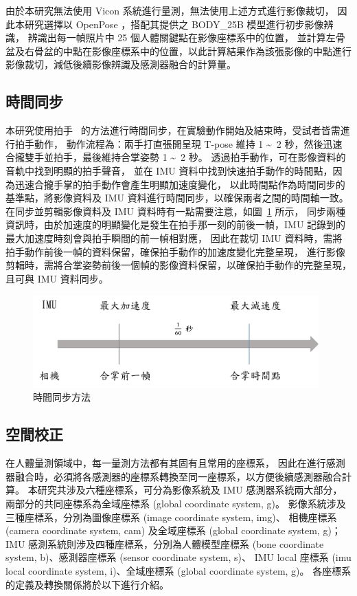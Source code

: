 由於本研究無法使用 Vicon 系統進行量測，無法使用上述方式進行影像裁切，
因此本研究選擇以 OpenPose ，搭配其提供之 BODY\_25B 模型進行初步影像辨識，
辨識出每一幀照片中 25 個人體關鍵點在影像座標系中的位置，
並計算左骨盆及右骨盆的中點在影像座標系中的位置，以此計算結果作為該張影像的中點進行影像裁切，減低後續影像辨識及感測器融合的計算量。

\subsection{時間同步}
本研究使用拍手~\cite{pons2012data} 的方法進行時間同步，在實驗動作開始及結束時，受試者皆需進行拍手動作，
動作流程為：兩手打直張開呈現 T-pose 維持 1 \textasciitilde\ 2 秒，然後迅速合攏雙手並拍手，最後維持合掌姿勢 1 \textasciitilde\ 2 秒。
透過拍手動作，可在影像資料的音軌中找到明顯的拍手聲音，
並在 IMU 資料中找到快速拍手動作的時間點，因為迅速合攏手掌的拍手動作會產生明顯加速度變化，
以此時間點作為時間同步的基準點，將影像資料及 IMU 資料進行時間同步，以確保兩者之間的時間軸一致。
在同步並剪輯影像資料及 IMU 資料時有一點需要注意，如圖~\ref{ch3_fig_timesyn} 所示，
同步兩種資訊時，由於加速度的明顯變化是發生在拍手那一刻的前後一幀，IMU 記錄到的最大加速度時刻會與拍手瞬間的前一幀相對應，
因此在裁切 IMU 資料時，需將拍手動作前後一幀的資料保留，確保拍手動作的加速度變化完整呈現，
進行影像剪輯時，需將合掌姿勢前後一個幀的影像資料保留，以確保拍手動作的完整呈現，且可與 IMU 資料同步。

\begin{figure}[!ht]
   \centering
   \includegraphics[width=11cm]{figure/ch3_fig_timesyn.png}
   \caption[時間同步方法]{時間同步方法}
   \label{ch3_fig_timesyn}
\end{figure}

\clearpage

\subsection{空間校正}
在人體量測領域中，每一量測方法都有其固有且常用的座標系，
因此在進行感測器融合時，必須將各感測器的座標系轉換至同一座標系，以方便後續感測器融合計算。
本研究共涉及六種座標系，可分為影像系統及 IMU 感測器系統兩大部分，兩部分的共同座標系為全域座標系 (global coordinate system, g)。
影像系統涉及三種座標系，分別為圖像座標系 (image coordinate system, img)、
相機座標系 (camera coordinate system, cam) 及全域座標系 (global coordinate system, g)；
IMU 感測系統則涉及四種座標系，分別為人體模型座標系 (bone coordinate system, b)、感測器座標系 (sensor coordinate system, s)、
IMU local 座標系 (imu local coordinate system, i)、全域座標系 (global coordinate system, g)。
各座標系的定義及轉換關係將於以下進行介紹。

